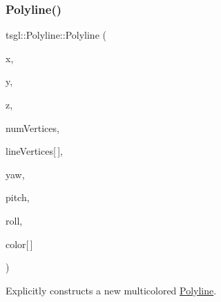 \subsubsection{\texorpdfstring{Polyline()}{Polyline()}\hspace{0.1cm}{\footnotesize\ttfamily [3/3]}}
{\footnotesize\ttfamily tsgl\+::\+Polyline\+::\+Polyline (\begin{DoxyParamCaption}\item[{float}]{x,  }\item[{float}]{y,  }\item[{float}]{z,  }\item[{int}]{num\+Vertices,  }\item[{float}]{line\+Vertices\mbox{[}$\,$\mbox{]},  }\item[{float}]{yaw,  }\item[{float}]{pitch,  }\item[{float}]{roll,  }\item[{\hyperlink{structtsgl_1_1_color_float}{Color\+Float}}]{color\mbox{[}$\,$\mbox{]} }\end{DoxyParamCaption})}



Explicitly constructs a new multicolored \hyperlink{classtsgl_1_1_polyline}{Polyline}. 

